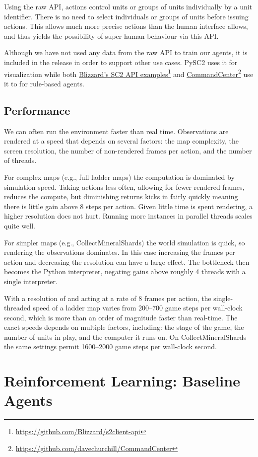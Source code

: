 \documentclass{article}
\newcommand{\footref}[2]{\href{#1}{#2}\footnote{\url{#1}}}
\begin{document}
Using the raw API, actions control units or groups of units individually by a unit identifier. There is no need to select individuals or groups of units before issuing actions. This allows much more precise actions than the human interface allows, and thus yields the possibility of super-human behaviour via this API.

Although we have not used any data from the raw API to train our agents, it is included in the release in order to support other use cases. PySC2 uses it for visualization while both \footref{https://github.com/Blizzard/s2client-api}{Blizzard's SC2 API examples} and \footref{https://github.com/davechurchill/CommandCenter}{CommandCenter} use it to for rule-based agents.

\subsection{Performance}

We can often run the environment faster than real time.
Observations are rendered at a speed that depends on several factors: the map complexity, the screen resolution, the number of non-rendered frames per action, and the number of threads.

For complex maps (e.g., full ladder maps) the computation is dominated by simulation speed. Taking actions less often, allowing for fewer rendered frames, reduces the compute, but diminishing returns kicks in fairly quickly meaning there is little gain above 8 steps per action. Given little time is spent rendering, a higher resolution does not hurt. Running more instances in parallel threads scales quite well.

For simpler maps (e.g., CollectMineralShards) the world simulation is quick, so rendering the observations dominates.  In this case increasing the frames per action and decreasing the resolution can have a large effect. The bottleneck then becomes the Python interpreter, negating gains above roughly 4 threads with a single interpreter.

With a resolution of  and acting at a rate of 8 frames per action, the single-threaded speed of a ladder map varies from 200--700 game steps per wall-clock second, which is more than an order of magnitude faster than real-time.  The exact speeds depends on multiple factors, including: the stage of the game, the number of units in play, and the computer it runs on. On CollectMineralShards the same settings permit 1600--2000 game steps per wall-clock second.
 \section{Reinforcement Learning: Baseline Agents}\label{sec:rl}
\end{document}

